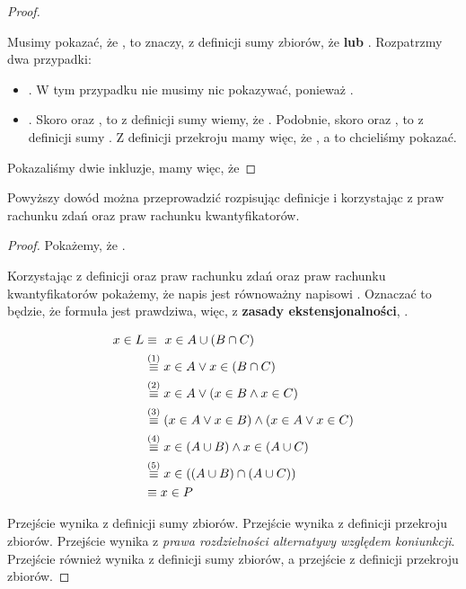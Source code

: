 \begin{proof}
\begin{enumerate}
    Musimy pokazać, że , to znaczy, z definicji sumy zbiorów, że  \textbf{lub} . Rozpatrzmy dwa przypadki:
    
    \begin{itemize}
        \item {}. W tym przypadku nie musimy nic pokazywać, ponieważ .
        \item {}. Skoro  oraz , to z definicji sumy wiemy, że . Podobnie, skoro  oraz , to z definicji sumy . Z definicji przekroju mamy więc, że , a to chcieliśmy pokazać. 
    \end{itemize}
\end{enumerate}

Pokazaliśmy dwie inkluzje, mamy więc, że 
\end{proof}

Powyższy dowód można przeprowadzić rozpisując definicje i korzystając z praw rachunku zdań oraz praw rachunku kwantyfikatorów.

\begin{proof}
Pokażemy, że . 

Korzystając z definicji oraz praw rachunku zdań oraz praw rachunku kwantyfikatorów pokażemy, że napis  jest równoważny napisowi . Oznaczać to będzie, że formuła  jest prawdziwa, więc, z \textbf{zasady ekstensjonalności}, .

\[
\begin{split}
    x \in L 
    & \equiv\ x \in A \cup (B \cap C) 
    \\& \stackrel{(1)}{\equiv} x \in A \vee x \in (B \cap C)
    \\& \stackrel{(2)}{\equiv} x \in A \vee (x \in B \wedge x \in C)
    \\& \stackrel{(3)}{\equiv} (x \in A \vee x \in B) \wedge (x \in A \vee x \in C)
    \\& \stackrel{(4)}{\equiv} x \in (A \cup B) \wedge x \in (A \cup C)
    \\& \stackrel{(5)}{\equiv} x \in ((A \cup B) \cap (A \cup C))
    \\& \equiv x \in P
\end{split}
\]

Przejście  wynika z definicji sumy zbiorów. Przejście  wynika z definicji przekroju zbiorów. Przejście  wynika z \textit{prawa rozdzielności alternatywy względem koniunkcji}. Przejście  również wynika z definicji sumy zbiorów, a przejście  z definicji przekroju zbiorów. 
\end{proof}

